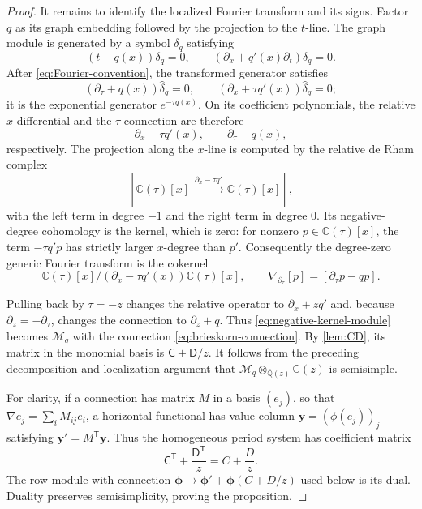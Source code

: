 \documentclass[11pt]{article}
\numberwithin{equation}{section}
\theoremstyle{definition}
\theoremstyle{remark}
\newcommand{\C}{\mathbb C}
\newcommand{\Qbar}{\overline{\mathbb Q}}
\newcommand{\Mcal}{\mathcal M}
\begin{document}
\begin{proof}
It remains to identify the localized Fourier transform and its signs.  Factor
$q$ as its graph embedding followed by the projection to the $t$-line.  The
graph module is generated by a symbol $\delta_q$ satisfying
\[
  (t-q(x))\delta_q=0,
  \qquad
  (\partial_x+q'(x)\partial_t)\delta_q=0.
\]
After \eqref{eq:Fourier-convention}, the transformed generator satisfies
\[
  (\partial_\tau+q(x))\widehat\delta_q=0,
  \qquad
  (\partial_x+\tau q'(x))\widehat\delta_q=0;
\]
it is the exponential generator $e^{-\tau q(x)}$.  On its coefficient
polynomials, the relative $x$-differential and the $\tau$-connection are
therefore
\[
  \partial_x-\tau q'(x),
  \qquad
  \partial_\tau-q(x),
\]
respectively.  The projection along the $x$-line is computed by the relative
de Rham complex
\[
  \left[
    \C(\tau)[x]
    \xrightarrow{\ \partial_x-\tau q'\ }
    \C(\tau)[x]
  \right],
\]
with the left term in degree $-1$ and the right term in degree $0$.  Its
negative-degree cohomology is the kernel, which is zero: for nonzero
$p\in\C(\tau)[x]$, the term $-\tau q'p$ has strictly larger $x$-degree than
$p'$.  Consequently the degree-zero generic Fourier transform is the
cokernel
\begin{equation}\label{eq:negative-kernel-module}
  \C(\tau)[x]\Big/(\partial_x-\tau q'(x))\C(\tau)[x],
  \qquad
  \nabla_{\partial_\tau}[p]=[\partial_\tau p-q p].
\end{equation}

Pulling back by $\tau=-z$ changes the relative operator to
$\partial_x+zq'$ and, because $\partial_z=-\partial_\tau$, changes the
connection to $\partial_z+q$.  Thus \eqref{eq:negative-kernel-module} becomes
$\Mcal_q$ with the connection \eqref{eq:brieskorn-connection}.  By
\cref{lem:CD}, its matrix in the monomial basis is
$\mathsf C+\mathsf D/z$.  It follows from the preceding decomposition and
localization argument that
$\Mcal_q\otimes_{\Qbar(z)}\C(z)$ is semisimple.

For clarity, if a connection has matrix $M$ in a basis $(e_j)$, so that
$\nabla e_j=\sum_iM_{ij}e_i$, a horizontal functional has value column
$\mathbf y=(\phi(e_j))_j$ satisfying $\mathbf y'=M^{\mathsf T}\mathbf y$.
Thus the homogeneous period system has coefficient matrix
\[
  \mathsf C^{\mathsf T}+\frac{\mathsf D^{\mathsf T}}z
  =C+\frac Dz.
\]
The row module with connection
$\boldsymbol\phi\mapsto\boldsymbol\phi'+\boldsymbol\phi(C+D/z)$ used below
is its dual.  Duality preserves semisimplicity, proving the proposition.
\end{proof}
\end{document}
